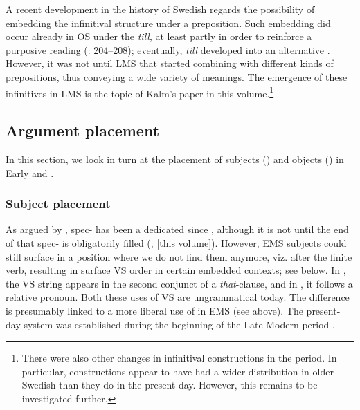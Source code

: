 \documentclass[output=paper]{langscibook}
\begin{document}
A recent development in the history of Swedish  regards the possibility of embedding the infinitival structure under a preposition. Such embedding did occur already in OS under the  \textit{till}, at least partly in order to reinforce a purposive reading (\citealt{Kalm2016Satsekvivalenta}: 204–208); eventually, \textit{till} developed into an alternative  \citep[210]{Kalm2016Satsekvivalenta}. However, it was not until LMS that  started combining with different kinds of prepositions, thus conveying a wide variety of  meanings. The emergence of these  infinitives in LMS is the topic of Kalm’s paper in this volume.\footnote{There were also other changes in infinitival constructions in the  period. In particular,  constructions appear to have had a wider distribution in older Swedish than they do in the present day. However, this remains to be investigated further.}


\subsection{ Argument placement}\label{sec:intro:3.2}


In this section, we look in turn at the placement of subjects () and objects () in Early and .


\subsubsection{Subject placement}\label{sec:intro:3.2.1}


As argued by \textcite{Hakansson2008}, spec- has been a dedicated  since , although it is not until the end of  that spec- is obligatorily filled (\citealt{Falk1993}, \citeyear{chapters/02} [this volume]). However, EMS subjects could still surface in a position where we do not find them anymore, viz. after the finite verb, resulting in surface VS order in certain embedded contexts; see  below. In , the VS string appears in the second conjunct of a \textit{that}{}-clause, and in , it follows a relative pronoun. Both these uses of VS are ungrammatical today. The difference is presumably linked to a more liberal use of  in EMS (see  above). The present-day system was established during the beginning of the Late Modern period \citep{Petzell2013}.
\end{document}
